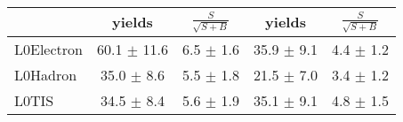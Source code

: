 \renewcommand{\arraystretch}{1.5} 
\begin{tabular}{l|c|c||c|c}
& yields & $\frac{S}{\sqrt{S+B}}$ & yields & $\frac{S}{\sqrt{S+B}}$\\
\hline
\hline
L0Electron & 60.1 $\pm$ 11.6 & 6.5 $\pm$ 1.6 & 35.9 $\pm$ 9.1 & 4.4 $\pm$ 1.2\\
\hline
L0Hadron & 35.0 $\pm$ 8.6 & 5.5 $\pm$ 1.8 & 21.5 $\pm$ 7.0 & 3.4 $\pm$ 1.2\\
\hline
L0TIS & 34.5 $\pm$ 8.4 & 5.6 $\pm$ 1.9 & 35.1 $\pm$ 9.1 & 4.8 $\pm$ 1.5 \\
\end{tabular}